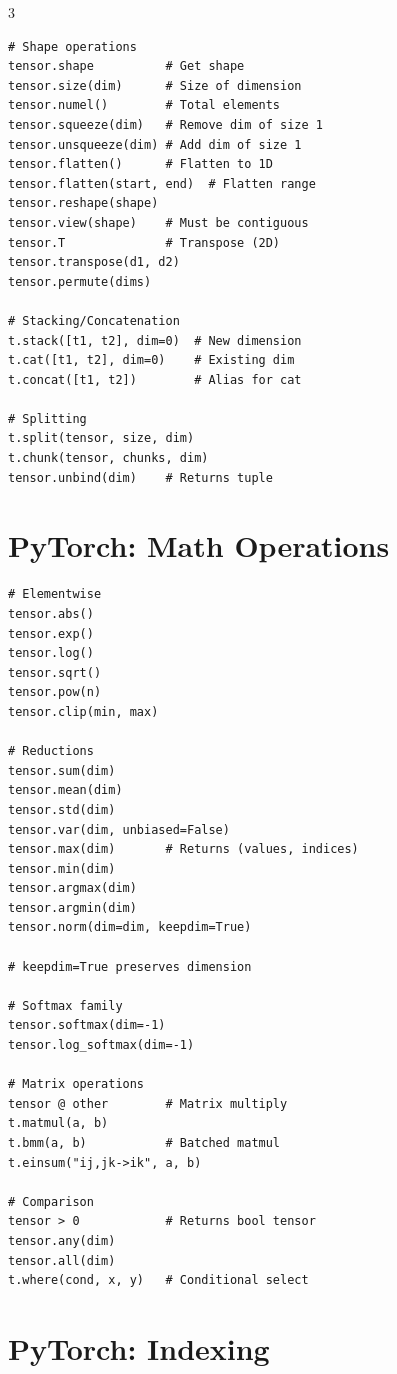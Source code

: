 \documentclass[10pt,a4paper,landscape]{article}
\begin{document}
\begin{multicols}{3}
\begin{lstlisting}
# Shape operations
tensor.shape          # Get shape
tensor.size(dim)      # Size of dimension
tensor.numel()        # Total elements
tensor.squeeze(dim)   # Remove dim of size 1
tensor.unsqueeze(dim) # Add dim of size 1
tensor.flatten()      # Flatten to 1D
tensor.flatten(start, end)  # Flatten range
tensor.reshape(shape)
tensor.view(shape)    # Must be contiguous
tensor.T              # Transpose (2D)
tensor.transpose(d1, d2)
tensor.permute(dims)

# Stacking/Concatenation
t.stack([t1, t2], dim=0)  # New dimension
t.cat([t1, t2], dim=0)    # Existing dim
t.concat([t1, t2])        # Alias for cat

# Splitting
t.split(tensor, size, dim)
t.chunk(tensor, chunks, dim)
tensor.unbind(dim)    # Returns tuple
\end{lstlisting}

\section{PyTorch: Math Operations}

\begin{lstlisting}
# Elementwise
tensor.abs()
tensor.exp()
tensor.log()
tensor.sqrt()
tensor.pow(n)
tensor.clip(min, max)

# Reductions
tensor.sum(dim)
tensor.mean(dim)
tensor.std(dim)
tensor.var(dim, unbiased=False)
tensor.max(dim)       # Returns (values, indices)
tensor.min(dim)
tensor.argmax(dim)
tensor.argmin(dim)
tensor.norm(dim=dim, keepdim=True)

# keepdim=True preserves dimension

# Softmax family
tensor.softmax(dim=-1)
tensor.log_softmax(dim=-1)

# Matrix operations
tensor @ other        # Matrix multiply
t.matmul(a, b)
t.bmm(a, b)           # Batched matmul
t.einsum("ij,jk->ik", a, b)

# Comparison
tensor > 0            # Returns bool tensor
tensor.any(dim)
tensor.all(dim)
t.where(cond, x, y)   # Conditional select
\end{lstlisting}

\section{PyTorch: Indexing}


\end{multicols}
\end{document}
